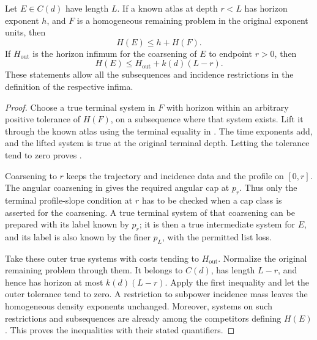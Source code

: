 \begin{lemma}\label{a03:composition}
Let \(E\in C(d)\) have length \(L\).  If a known atlas at depth \(r<L\)
has horizon exponent \(h\), and \(F\) is a homogeneous remaining problem
in the original exponent units, then
\begin{equation}
H(E)\le h+H(F).
 \label{a03:known-composition}
\end{equation}
If \(H_{\mathrm{out}}\) is the horizon infimum for the coarsening of \(E\)
to endpoint \(r>0\), then
\begin{equation}
H(E)\le H_{\mathrm{out}}+k(d)(L-r).
 \label{a03:coarsened-composition}
\end{equation}
These statements allow all the subsequences and incidence restrictions
in the definition of the respective infima.
\end{lemma}
\begin{proof}
Choose a true terminal system in \(F\) with horizon within an arbitrary
positive tolerance of \(H(F)\), on a subsequence where that system exists.
Lift it through the known atlas using the terminal equality in
.  The time exponents add, and the lifted system is
true at the original terminal depth.  Letting the tolerance tend to zero
proves .

Coarsening to \(r\) keeps the trajectory and incidence data and the profile
on \([0,r]\).  The angular coarsening in
 gives the required angular cap at \(p_r\).  Thus only
the terminal profile-slope condition at \(r\) has to be checked when a cap
class is asserted for the coarsening.  A true terminal system of that
coarsening can be prepared with its label known by \(p_r\); it is then a
true intermediate system for \(E\), and its label is also known by the
finer \(p_L\), with the permitted list loss.

Take these outer true systems with costs tending to \(H_{\mathrm{out}}\).
Normalize the original remaining problem through them.  It belongs to
\(C(d)\), has length \(L-r\), and hence has horizon at most
\(k(d)(L-r)\).  Apply the first inequality and let the outer tolerance
tend to zero.  A restriction to subpower incidence mass leaves the
homogeneous density exponents unchanged.  Moreover, systems on such
restrictions and subsequences are already among the competitors defining
\(H(E)\).  This proves the inequalities with their stated quantifiers.
\end{proof}

